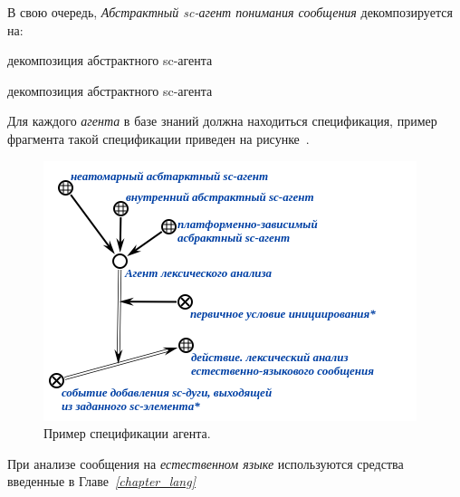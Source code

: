 В свою очередь, \textit{Абстрактный sc-агент понимания сообщения} декомпозируется на:

\begin{SCn}

    \begin{scnrelfromset}{декомпозиция абстрактного sc-агента}
        \begin{scnindent}
            \begin{scnrelfromset}{декомпозиция абстрактного sc-агента}
            \end{scnrelfromset}
        \end{scnindent}
    \end{scnrelfromset}

\end{SCn}

Для каждого \textit{агента} в базе знаний должна находиться спецификация, пример фрагмента такой спецификации приведен на рисунке~\textit{}.

\begin{figure}[h]
    \centering
    \includegraphics[scale=0.8]{images/part4/chapter_nl_interfaces/agent_spec}
    \caption{Пример спецификации агента.}
    \label{fig:agent_spec}
\end{figure}

При анализе сообщения на \textit{естественном языке} используются средства введенные в Главе~\textit{\ref{chapter_lang}~}

